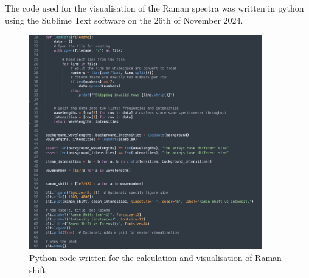 The code used for the visualisation of the Raman spectra was written in python using the Sublime Text software on the 26th of November 2024.
\\


\begin{figure}[h]
    \centering
    \includegraphics[width=0.9\textwidth]{images/code_raman_shift.png}
    \caption{Python code written for the calculation and visualisation of Raman shift}
    \label{fig:python}
\end{figure}